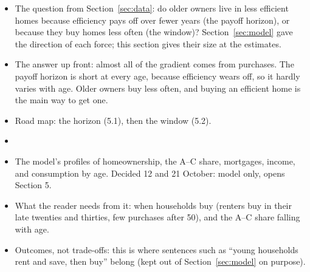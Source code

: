 %

\begin{itemize}
  \item The question from Section~\ref{sec:data}: do older owners live in
    less efficient homes because efficiency pays off over fewer years
    (the payoff horizon), or because they buy homes less often (the
    window)? Section~\ref{sec:model} gave the direction of each force;
    this section gives their size at the estimates.
  \item The answer up front: almost all of the gradient comes from
    purchases. The payoff horizon is short at every age, because
    efficiency wears off, so it hardly varies with age. Older owners buy
    less often, and buying an efficient home is the main way to get one.
  \item Road map: the horizon (5.1), then the window (5.2).
  \item {}
\end{itemize}

\begin{itemize}
  \item The model's profiles of homeownership, the A--C share, mortgages,
    income, and consumption by age. Decided 12 and 21 October: model only,
    opens Section 5.
  \item What the reader needs from it: when households buy (renters buy in
    their late twenties and thirties, few purchases after 50), and the
    A--C share falling with age.
  \item Outcomes, not trade-offs: this is where sentences such as ``young
    households rent and save, then buy'' belong (kept out of
    Section~\ref{sec:model} on purpose).
\end{itemize}

